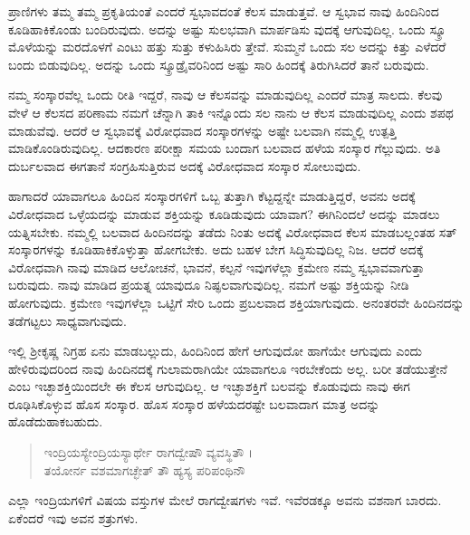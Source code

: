 ಪ್ರಾಣಿಗಳು ತಮ್ಮ ತಮ್ಮ ಪ್ರಕೃತಿಯಂತೆ ಎಂದರೆ ಸ್ವಭಾವದಂತೆ ಕೆಲಸ ಮಾಡುತ್ತವೆ. ಆ ಸ್ವಭಾವ ನಾವು ಹಿಂದಿನಿಂದ ಕೂಡಿಹಾಕಿಕೊಂಡು ಬಂದಿರುವುದು. ಅದನ್ನು ಅಷ್ಟು ಸುಲಭವಾಗಿ ಮಾರ್ಪಡಿಸು ವುದಕ್ಕೆ ಆಗುವುದಿಲ್ಲ. ಒಂದು ಸ್ಕ್ರೂ ಮೊಳೆಯನ್ನು ಮರದೊಳಗೆ ಎಂಟು ಹತ್ತು ಸುತ್ತು ಕಳುಹಿಸಿರು ತ್ತೇವೆ. ಸುಮ್ಮನೆ ಒಂದು ಸಲ ಅದನ್ನು ಕಿತ್ತು ಎಳೆದರೆ ಬಂದು ಬಿಡುವುದಿಲ್ಲ. ಅದನ್ನು ಒಂದು ಸ್ಕ್ರೂಡ್ರೈವರಿನಿಂದ ಅಷ್ಟು ಸಾರಿ ಹಿಂದಕ್ಕೆ ತಿರುಗಿಸಿದರೆ ತಾನೆ ಬರುವುದು.

ನಮ್ಮ ಸಂಸ್ಕಾರವೆಲ್ಲ ಒಂದು ರೀತಿ ಇದ್ದರೆ, ನಾವು ಆ ಕೆಲಸವನ್ನು ಮಾಡುವುದಿಲ್ಲ ಎಂದರೆ ಮಾತ್ರ ಸಾಲದು. ಕೆಲವು ವೇಳೆ ಆ ಕೆಲಸದ ಪರಿಣಾಮ ನಮಗೆ ಚೆನ್ನಾಗಿ ತಾಕಿ ಇನ್ನೊಂದು ಸಲ ನಾನು ಆ ಕೆಲಸ ಮಾಡುವುದಿಲ್ಲ ಎಂದು ಶಪಥ ಮಾಡುವೆವು. ಆದರೆ ಆ ಸ್ವಭಾವಕ್ಕೆ ವಿರೋಧವಾದ ಸಂಸ್ಕಾರಗಳನ್ನು ಅಷ್ಟೇ ಬಲವಾಗಿ ನಮ್ಮಲ್ಲಿ ಉತ್ಪತ್ತಿ ಮಾಡಿಕೊಂಡಿರುವುದಿಲ್ಲ. ಆದಕಾರಣ ಪರೀಕ್ಷಾ ಸಮಯ ಬಂದಾಗ ಬಲವಾದ ಹಳೆಯ ಸಂಸ್ಕಾರ ಗೆಲ್ಲುವುದು. ಅತಿ ದುರ್ಬಲವಾದ ಈಗತಾನೆ ಸಂಗ್ರಹಿಸುತ್ತಿರುವ ಅದಕ್ಕೆ ವಿರೋಧವಾದ ಸಂಸ್ಕಾರ ಸೋಲುವುದು.

ಹಾಗಾದರೆ ಯಾವಾಗಲೂ ಹಿಂದಿನ ಸಂಸ್ಕಾರಗಳಿಗೆ ಒಬ್ಬ ತುತ್ತಾಗಿ ಕೆಟ್ಟದ್ದನ್ನೇ ಮಾಡುತ್ತಿದ್ದರೆ, ಅವನು ಅದಕ್ಕೆ ವಿರೋಧವಾದ ಒಳ್ಳೆಯದನ್ನು ಮಾಡುವ ಶಕ್ತಿಯನ್ನು ಕೂಡಿಡುವುದು ಯಾವಾಗ? ಈಗಿನಿಂದಲೆ ಅದನ್ನು ಮಾಡಲು ಯತ್ನಿಸಬೇಕು. ನಮ್ಮಲ್ಲಿ ಬಲವಾದ ಹಿಂದಿನದನ್ನು ತಡೆದು ನಿಂತು ಅದಕ್ಕೆ ವಿರೋಧವಾದ ಕೆಲಸ ಮಾಡಬಲ್ಲಂತಹ ಸತ್ ಸಂಸ್ಕಾರಗಳನ್ನು ಕೂಡಿಹಾಕಿಕೊಳ್ಳುತ್ತಾ ಹೋಗಬೇಕು. ಅದು ಬಹಳ ಬೇಗ ಸಿದ್ಧಿಸುವುದಿಲ್ಲ ನಿಜ. ಆದರೆ ಅದಕ್ಕೆ ವಿರೋಧವಾಗಿ ನಾವು ಮಾಡಿದ ಆಲೋಚನೆ, ಭಾವನೆ, ಕಲ್ಪನೆ ಇವುಗಳೆಲ್ಲಾ ಕ್ರಮೇಣ ನಮ್ಮ ಸ್ವಭಾವವಾಗುತ್ತಾ ಬರುವುದು. ನಾವು ಮಾಡಿದ ಪ್ರಯತ್ನ ಯಾವುದೂ ನಿಷ್ಫಲವಾಗುವುದಿಲ್ಲ. ನಮಗೆ ಅಷ್ಟು ಶಕ್ತಿಯನ್ನು ನೀಡಿ ಹೋಗುವುದು. ಕ್ರಮೇಣ ಇವುಗಳೆಲ್ಲಾ ಒಟ್ಟಿಗೆ ಸೇರಿ ಒಂದು ಪ್ರಬಲವಾದ ಶಕ್ತಿಯಾಗುವುದು. ಅನಂತರವೇ ಹಿಂದಿನದನ್ನು ತಡೆಗಟ್ಟಲು ಸಾಧ್ಯವಾಗುವುದು.

ಇಲ್ಲಿ ಶ್ರೀಕೃಷ್ಣ ನಿಗ್ರಹ ಏನು ಮಾಡಬಲ್ಲುದು, ಹಿಂದಿನಿಂದ ಹೇಗೆ ಆಗುವುದೋ ಹಾಗೆಯೇ ಆಗುವುದು ಎಂದು ಹೇಳಿರುವುದರಿಂದ ನಾವು ಹಿಂದಿನದಕ್ಕೆ ಗುಲಾಮರಾಗಿಯೇ ಯಾವಾಗಲೂ ಇರಬೇಕೆಂದು ಅಲ್ಲ. ಬರೀ ತಡೆಯುತ್ತೇನೆ ಎಂಬ ಇಚ್ಛಾಶಕ್ತಿಯಿಂದಲೇ ಈ ಕೆಲಸ ಆಗುವುದಿಲ್ಲ. ಆ ಇಚ್ಛಾಶಕ್ತಿಗೆ ಬಲವನ್ನು ಕೊಡುವುದು ನಾವು ಈಗ ರೂಢಿಸಿಕೊಳ್ಳುವ ಹೊಸ ಸಂಸ್ಕಾರ. ಹೊಸ ಸಂಸ್ಕಾರ ಹಳೆಯದರಷ್ಟೇ ಬಲವಾದಾಗ ಮಾತ್ರ ಅದನ್ನು ಹೊಡೆದುಹಾಕಬಹುದು.

\begin{verse}
ಇಂದ್ರಿಯಸ್ಯೇಂದ್ರಿಯಸ್ಯಾರ್ಥೇ ರಾಗದ್ವೇಷೌ ವ್ಯವಸ್ಥಿತೌ ।\\ತಯೋರ್ನ ವಶಮಾಗಚ್ಛೇತ್ ತೌ ಹ್ಯಸ್ಯ ಪರಿಪಂಥಿನೌ 
\end{verse}

{\small ಎಲ್ಲಾ ಇಂದ್ರಿಯಗಳಿಗೆ ವಿಷಯ ವಸ್ತುಗಳ ಮೇಲೆ ರಾಗದ್ವೇಷಗಳು ಇವೆ. ಇವೆರಡಕ್ಕೂ ಅವನು ವಶನಾಗ ಬಾರದು. ಏಕೆಂದರೆ ಇವು ಅವನ ಶತ್ರುಗಳು.}

